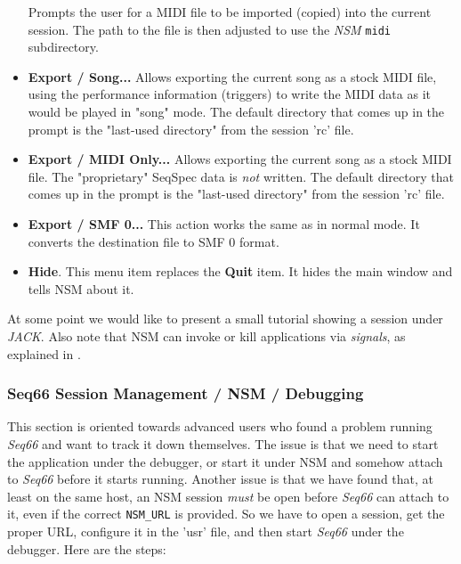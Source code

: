 \begin{itemize}
         Prompts the user for a MIDI file to
         be imported (copied) into the current session.  The path to the file
         is then adjusted to use the \textsl{NSM} \texttt{midi} subdirectory.
      \item \textbf{Export / Song...}
         Allows exporting the current song as a stock MIDI file, using the
         performance information (triggers) to write the MIDI data as it would
         be played in "song" mode.
         The default directory that comes up in the
         prompt is the "last-used directory" from the session 'rc' file.
      \item \textbf{Export / MIDI Only...}
         Allows exporting the current song as a stock MIDI file.
         The "proprietary" SeqSpec data is \textsl{not} written.
         The default directory that comes up in the
         prompt is the "last-used directory" from the session 'rc' file.
      \item \textbf{Export / SMF 0...}
         This action works the same as in normal mode.
         It converts the destination file to SMF 0 format.
      \item \textbf{Hide}.
         This menu item replaces the \textbf{Quit} item.
         It hides the main window and tells NSM about it.
   \end{itemize}

   At some point we would like to present a small tutorial showing a session
   under \textsl{JACK}.
   Also note that NSM can invoke or kill applications via
   \textsl{signals}, as explained in 
   .

\subsubsection{Seq66 Session Management / NSM / Debugging}
\label{subsubsec:sessions_debugging}

   This section is oriented towards advanced users who found a problem running
   \textsl{Seq66} and want to track it down themselves.  The issue is that we
   need to start the application under the debugger, or start it under NSM and
   somehow attach to \textsl{Seq66} before it starts running.  Another issue is
   that we have found that, at least on the same host, an NSM session
   \textsl{must} be open before \textsl{Seq66} can attach to it, even if the
   correct \texttt{NSM\_URL} is provided.
   So we have to open a session, get the proper URL, configure it in the 'usr'
   file, and then start \textsl{Seq66} under the debugger.
   Here are the steps:

